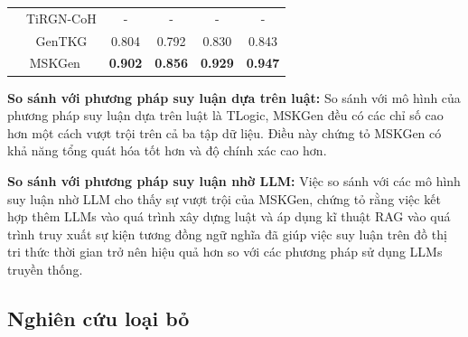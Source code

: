 \begin{table}[H]
\begin{adjustbox}{width=\textwidth}
\begin{tabular}{|cc|cccc|}
\multicolumn{1}{|c|}{}                                 & TiRGN-CoH                & -                        & -                          & -                          & -              \\ \cline{2-2}
\multicolumn{1}{|c|}{}                                 & GenTKG                   & 0.804                    & 0.792                      & 0.830                      & 0.843          \\ \hline
\multicolumn{2}{|c|}{MSKGen}                                                      & \textbf{0.902}           & \textbf{0.856}             & \textbf{0.929}             & \textbf{0.947} \\ \hline
\end{tabular}
\end{adjustbox}  
\end{table}
\vspace{-5mm}

\textbf{So sánh với phương pháp suy luận dựa trên luật:} So sánh với mô hình của phương pháp suy luận dựa trên luật là TLogic,
MSKGen đều có các chỉ số cao hơn một cách vượt trội trên cả ba tập dữ liệu. Điều này chứng tỏ MSKGen có khả năng tổng quát hóa tốt
hơn và độ chính xác cao hơn.

\textbf{So sánh với phương pháp suy luận nhờ LLM:} Việc so sánh với các mô hình suy luận nhờ LLM cho thấy sự vượt trội của MSKGen, chứng
tỏ rằng việc kết hợp thêm LLMs vào quá trình xây dựng luật và áp dụng kĩ thuật RAG vào quá trình truy xuất sự kiện tương đồng ngữ nghĩa đã giúp việc suy luận
trên đồ thị tri thức thời gian trở nên hiệu quả hơn so với các phương pháp sử dụng LLMs truyền thống.
\subsection{Nghiên cứu loại bỏ}

